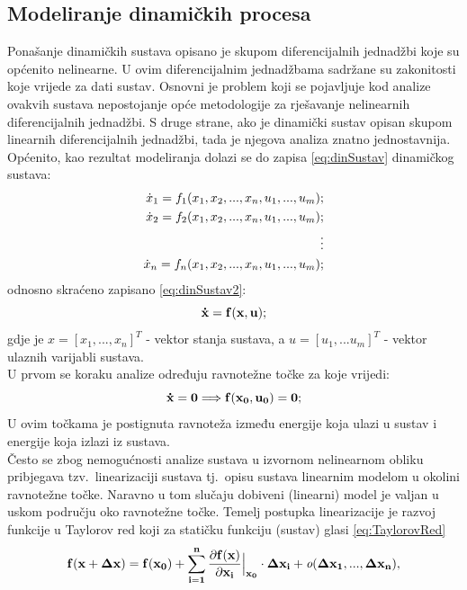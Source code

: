 \documentclass[times, utf8, diplomski]{fer}
\begin{document}
\subsection{Modeliranje dinamičkih procesa}
Ponašanje dinamičkih sustava opisano je skupom diferencijalnih jednadžbi koje su općenito nelinearne. U ovim diferencijalnim jednadžbama sadržane su zakonitosti koje vrijede za dati sustav. Osnovni je problem koji se pojavljuje kod analize ovakvih sustava nepostojanje opće metodologije za rješavanje nelinearnih diferencijalnih jednadžbi. S druge strane, ako je dinamički sustav opisan skupom linearnih diferencijalnih jednadžbi, tada je njegova analiza znatno jednostavnija.
Općenito, kao rezultat modeliranja dolazi se do zapisa \ref{eq:dinSustav} dinamičkog sustava:
\begin{equation}
\centering
	\begin{aligned}
		\dot{x}_1 = f_1(x_1,x_2,...,x_n,u_1,...,u_m);\\
		\dot{x}_2 = f_2(x_1,x_2,...,x_n,u_1,...,u_m);\\
		\vdots\\
		\dot{x}_n = f_n(x_1,x_2,...,x_n,u_1,...,u_m);\\
	\end{aligned}
\label{eq:dinSustav}
\end{equation}
odnosno skraćeno zapisano \ref{eq:dinSustav2}: 
\begin{equation}
\centering
	\mathbf{\dot{x} = f(x,u)};
\label{eq:dinSustav2}
\end{equation}
gdje je $x=[x_1,...,x_n]^T$ - vektor stanja sustava, a $u = [u_1,...u_m]^T$ - vektor ulaznih varijabli sustava.\\
U prvom se koraku analize određuju ravnotežne točke  za koje vrijedi:
\begin{equation}
\centering
	\mathbf{\dot{x} = 0 \Longrightarrow f(x_0,u_0) = 0};
\label{eq:dinSustav2}
\end{equation}
U ovim točkama je postignuta ravnoteža između energije koja ulazi u sustav i energije koja izlazi iz sustava.\\
Često se zbog nemogućnosti analize sustava u izvornom nelinearnom obliku pribjegava tzv.~linearizaciji sustava tj.~opisu sustava linearnim modelom u okolini ravnotežne točke.
Naravno u tom slučaju dobiveni (linearni) model je valjan u uskom području oko ravnotežne
točke. Temelj postupka linearizacije je razvoj funkcije u Taylorov red koji za statičku funkciju
(sustav) glasi \ref{eq:TaylorovRed}
\begin{equation}
\centering
	\mathbf{f(x+\Delta x) = f(x_0)+\sum_{i=1}^{n}{\frac{\partial f(x)}{\partial x_i}}\Big|_{x_0}\cdot\Delta x_i + \emph{o}(\Delta x_1,...,\Delta x_n)},
\label{eq:TaylorovRed}
\end{equation}
\end{document}
